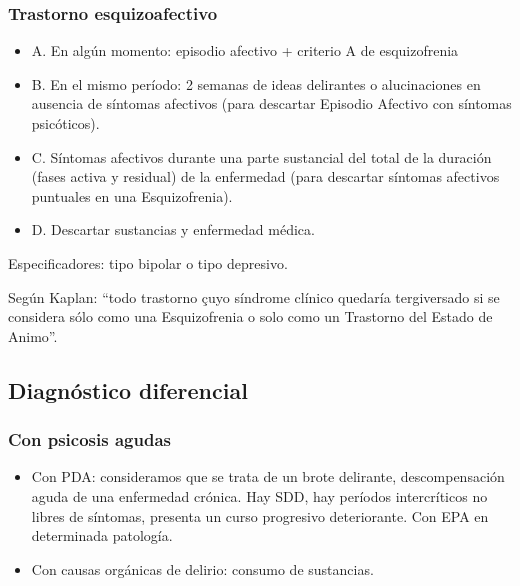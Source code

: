 \subsubsection*{Trastorno esquizoafectivo}
\begin{itemize}
    \item A. En algún momento: episodio afectivo + criterio A de esquizofrenia
    \item B. En el mismo período: 2 semanas de ideas delirantes o alucinaciones en ausencia de síntomas afectivos (para descartar Episodio Afectivo con síntomas psicóticos).
    \item C. Síntomas afectivos durante una parte sustancial del total de la duración (fases activa y residual) de la enfermedad (para descartar síntomas afectivos puntuales en una Esquizofrenia).
    \item D. Descartar sustancias y enfermedad médica.
\end{itemize}
Especificadores: tipo bipolar o tipo depresivo.

Según Kaplan: ``todo trastorno çuyo síndrome clínico quedaría tergiversado si se considera sólo como una Esquizofrenia o solo como un Trastorno del Estado de Animo''.
\subsection*{Diagnóstico diferencial}
\subsubsection*{Con psicosis agudas}
\begin{itemize}
    \item Con PDA: consideramos que se trata de un brote delirante, descompensación aguda de una enfermedad crónica. Hay SDD, hay períodos intercríticos no libres de síntomas, presenta un curso progresivo deteriorante. Con EPA en determinada patología.
    \item Con causas orgánicas de delirio: consumo de sustancias.
\end{itemize}

